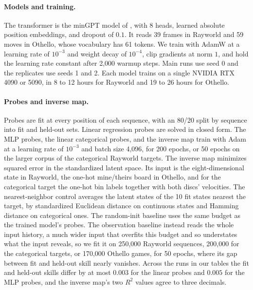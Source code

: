 \documentclass{article} %
\begin{document}
\paragraph{Models and training.}
The transformer is the minGPT model of \citet{li2023othello}, with 8 heads, learned absolute position embeddings, and dropout of $0.1$. It reads 39 frames in Rayworld and 59 moves in Othello, whose vocabulary has 61 tokens. We train with AdamW at a learning rate of $10^{-3}$ and weight decay of $10^{-4}$, clip gradients at norm $1$, and hold the learning rate constant after 2,000 warmup steps. Main runs use seed 0 and the replicates use seeds 1 and 2. Each model trains on a single NVIDIA RTX 4090 or 5090, in 8 to 12 hours for Rayworld and 19 to 26 hours for Othello.

\paragraph{Probes and inverse map.}
Probes are fit at every position of each sequence, with an 80/20 split by sequence into fit and held-out sets. Linear regression probes are solved in closed form. The MLP probes, the linear categorical probes, and the inverse map train with Adam at a learning rate of $10^{-3}$ and batch size 4,096, for 200 epochs, or 50 epochs on the larger corpus of the categorical Rayworld targets. The inverse map minimizes squared error in the standardized latent space. Its input is the eight-dimensional state in Rayworld, the one-hot mine/theirs board in Othello, and for the categorical target the one-hot bin labels together with both discs' velocities. The nearest-neighbor control averages the latent states of the 10 fit states nearest the target, by standardized Euclidean distance on continuous states and Hamming distance on categorical ones. The random-init baseline uses the same budget as the trained model's probes. The observation baseline instead reads the whole input history, a much wider input that overfits this budget and so understates what the input reveals, so we fit it on 250,000 Rayworld sequences, 200,000 for the categorical targets, or 170,000 Othello games, for 50 epochs, where its gap between fit and held-out skill nearly vanishes. Across the runs in our tables the fit and held-out skills differ by at most $0.003$ for the linear probes and $0.005$ for the MLP probes, and the inverse map's two $R^2$ values agree to three decimals. 
\end{document}

